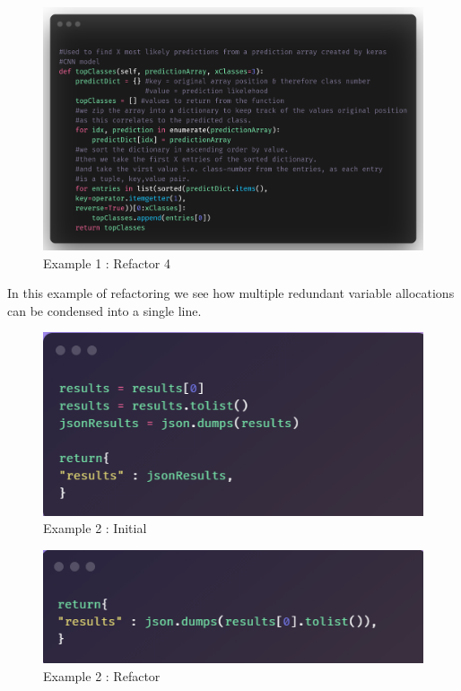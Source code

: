    \begin{figure}[H]
     \begin{center}
       \includegraphics[scale=0.55]{Images/Refactor/refactorA4}
       \caption{Example 1 : Refactor 4}
       \label{fig:refactorA4}
     \end{center}
   \end{figure}

   In this example of refactoring we see how multiple redundant variable allocations can be condensed into a single line.
   \begin{figure}[H]
     \begin{center}
       \includegraphics[scale=0.55]{Images/Refactor/refactorB1}
       \caption{Example 2 : Initial}
       \label{fig:refactorB1}
     \end{center}
   \end{figure}

   \begin{figure}[H]
     \begin{center}
       \includegraphics[scale=0.55]{Images/Refactor/refactorB2}
       \caption{Example 2 : Refactor}
       \label{fig:refactorB2}
     \end{center}
   \end{figure}

